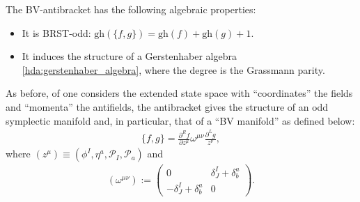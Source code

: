     \begin{property}
        The BV-antibracket has the following algebraic properties:
        \begin{itemize}
            \item It is BRST-odd: $\mathrm{gh}(\{f,g\}) = \mathrm{gh}(f)+\mathrm{gh}(g)+1$.
            \item It induces the structure of a Gerstenhaber algebra \ref{hda:gerstenhaber_algebra}, where the degree is the Grassmann parity.
        \end{itemize}
        As before, of one considers the extended state space with ``coordinates'' the fields and ``momenta'' the antifields, the antibracket gives the structure of an odd symplectic manifold and, in particular, that of a ``BV manifold'' as defined below:
        \begin{gather}
            \{f,g\} = \frac{\partial^Rf}{\partial z^\mu}\omega^{\mu\nu}\frac{\partial^Lg}{z^\nu},
        \end{gather}
        where $(z^\mu)\equiv(\phi^I,\eta^a,\mathcal{P}_I,\mathcal{P}_a)$ and
        \begin{gather}
            (\omega^{\mu\nu}) :=
            \begin{pmatrix}
                0&\delta^I_J+\delta^a_b\\
                -\delta^I_J+\delta^a_b&0
            \end{pmatrix}.
        \end{gather}
    \end{property}

